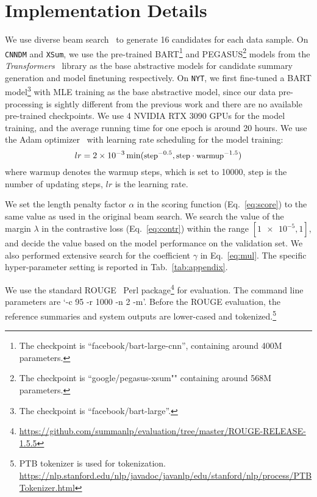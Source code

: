 \documentclass[11pt]{article}
\begin{document}
\section{Implementation Details}
\label{sec:appendix}
We use diverse beam search~\citep{Vijayakumar_Cogswell_Selvaraju_Sun_Lee_Crandall_Batra_2018} to generate 16 candidates for each data sample.
On \texttt{CNNDM} and \texttt{XSum}, we use the pre-trained BART\footnote{The checkpoint is ``facebook/bart-large-cnn'', containing around 400M parameters.} and PEGASUS\footnote{The checkpoint is ``google/pegasus-xsum"" containing around 568M parameters.} models from the \textit{Transformers}~\citep{wolf-etal-2020-transformers} library as the base abstractive models for candidate summary generation and model finetuning respectively.
On \texttt{NYT}, we first fine-tuned a BART model\footnote{The checkpoint is ``facebook/bart-large''.} with MLE training as the base abstractive model, since our data pre-processing is sightly different from the previous work and there are no available pre-trained checkpoints.  
We use 4 NVIDIA RTX 3090 GPUs for the model training, and the average running time for one epoch is around 20 hours.
We use the Adam optimizer~\citep{DBLP:journals/corr/KingmaB14} with learning rate scheduling for the model training:
\begin{equation}
\small
    lr = \num{2e-3}\min(\textrm{step}^{-0.5}, \textrm{step}\cdot\textrm{warmup}^{-1.5}) \nonumber
\end{equation}
where $\mathrm{warmup}$ denotes the warmup steps, which is set to 10000, $\mathrm{step}$ is the number of updating steps, $lr$ is the learning rate.


We set the length penalty factor $\alpha$ in the scoring function (Eq.~\ref{eq:score}) to the same value as used in the original beam search.
We search the value of the margin $\lambda$ in the contrastive loss (Eq.~\ref{eq:contr}) within the range 
$[\num{1e-5}, 1]$,
and decide the value based on the model performance on the validation set.
We also performed extensive search for the coefficient $\gamma$ in Eq.~\ref{eq:mul}.
The specific hyper-parameter setting is reported in Tab.~\ref{tab:appendix}.

We use the standard ROUGE~\citep{lin-2004-rouge} Perl package\footnote{\url{https://github.com/summanlp/evaluation/tree/master/ROUGE-RELEASE-1.5.5}} for evaluation.
The command line parameters are `-c 95 -r 1000 -n 2 -m'.
Before the ROUGE evaluation, the reference summaries and system outputs are lower-cased and tokenized.\footnote{PTB tokenizer is used for tokenization. \url{https://nlp.stanford.edu/nlp/javadoc/javanlp/edu/stanford/nlp/process/PTBTokenizer.html}}
\end{document}
